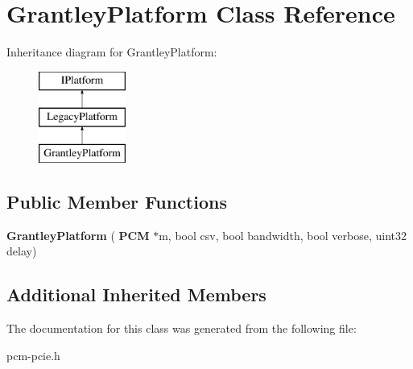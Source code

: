 \section{Grantley\+Platform Class Reference}
\label{classGrantleyPlatform}
Inheritance diagram for Grantley\+Platform\+:\begin{figure}[H]
\begin{center}
\leavevmode
\includegraphics[height=3.000000cm]{classGrantleyPlatform}
\end{center}
\end{figure}
\subsection*{Public Member Functions}
\begin{DoxyCompactItemize}
\item 
\mbox{\label{classGrantleyPlatform_a312372a1f51673c9f56810f6b283cae5}} 
{\bfseries Grantley\+Platform} (\textbf{ P\+CM} $\ast$m, bool csv, bool bandwidth, bool verbose, uint32 delay)
\end{DoxyCompactItemize}
\subsection*{Additional Inherited Members}


The documentation for this class was generated from the following file\+:\begin{DoxyCompactItemize}
\item 
pcm-\/pcie.\+h\end{DoxyCompactItemize}
